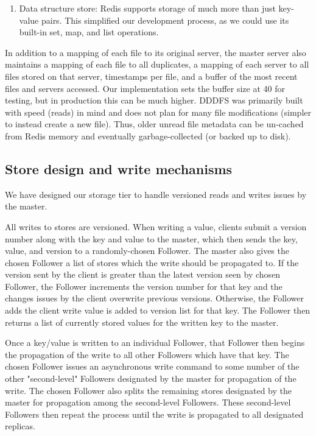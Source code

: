 \documentclass[twoside]{article}
\begin{document}
\begin{multicols}{2}
\begin{enumerate}
	\item Data structure store: Redis supports storage of much more than just key-value pairs. This simplified our development process, as we could use its built-in set, map, and list operations. 
\end{enumerate}
In addition to a mapping of each file to its original server, the master server also maintains a mapping of each file to all duplicates, a mapping of each server to all files stored on that server, timestamps per file, and a buffer of the most recent files and servers accessed. Our implementation sets the buffer size at 40 for testing, but in production this can be much higher. DDDFS was primarily built with speed (reads) in mind and does not plan for many file modifications (simpler to instead create a new file). Thus, older unread file metadata can be un-cached from Redis memory and eventually garbage-collected (or backed up to disk).

\subsection*{Store design and write mechanisms}
We have designed our storage tier to handle versioned reads and writes issues by the master. 

All writes to stores are versioned. When writing a value, clients submit a version number along with the key and value to the master, which then sends the key, value, and version to a randomly-chosen Follower. The master also gives the chosen Follower a list of stores which the write should be propagated to. If the version sent by the client is greater than the latest version seen by chosen Follower, the Follower increments the version number for that key and the changes issues by the client overwrite previous versions. Otherwise, the Follower adds the client write value is added to version list for that key. The Follower then returns a list of currently stored values for the written key to the master.

Once a key/value is written to an individual Follower, that Follower then begins the propagation of the write to all other Followers which have that key. The chosen Follower issues an asynchronous write command to some number of the other "second-level" Followers designated by the master for propagation of the write. The chosen Follower also splits the remaining stores designated by the master for propagation among the second-level Followers. These second-level Followers then repeat the process until the write is propagated to all designated replicas.


\end{multicols}
\end{document}
